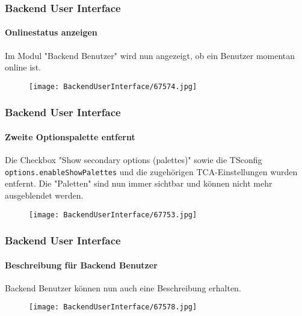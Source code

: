 \begin{frame}[fragile]
	\frametitle{Backend User Interface}
	\framesubtitle{Onlinestatus anzeigen}

	Im Modul "Backend Benutzer" wird nun angezeigt, ob ein Benutzer momentan online ist.

	\begin{figure}
		\texttt{[image: BackendUserInterface/67574.jpg]}
	\end{figure}

\end{frame}

\begin{frame}[fragile]
	\frametitle{Backend User Interface}
	\framesubtitle{Zweite Optionspalette entfernt}

	Die Checkbox "Show secondary options (palettes)" sowie die TSconfig \texttt{options.enableShowPalettes}
	und die zugehörigen TCA-Einstellungen wurden entfernt. Die "Paletten" sind nun immer sichtbar und
	können nicht mehr ausgeblendet werden.

	\begin{figure}
		\texttt{[image: BackendUserInterface/67753.jpg]}
	\end{figure}

\end{frame}

\begin{frame}[fragile]
	\frametitle{Backend User Interface}
	\framesubtitle{Beschreibung für Backend Benutzer}

	Backend Benutzer können nun auch eine Beschreibung erhalten.

	\begin{figure}
		\texttt{[image: BackendUserInterface/67578.jpg]}
	\end{figure}

\end{frame}

